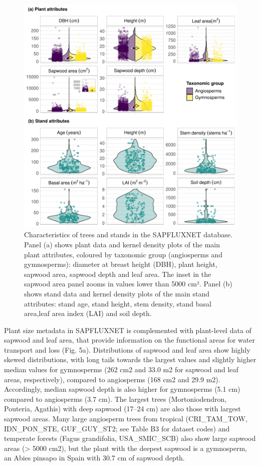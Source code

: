 \documentclass[11pt,twoside]{reedthesis}
\begin{document}
\setlength{\abovecaptionskip}{0pt}
\begin{figure}[hbt!]

{\centering \includegraphics[width=1\linewidth]{figure/CH3/Figure5} 

}

\caption[Characteristics of trees and stands in the SAPFLUXNET database.]{Characteristics of trees and stands in the SAPFLUXNET database. Panel (a) shows plant data and kernel density plots of the main plant attributes, coloured by taxonomic group (angiosperms and gymnosperms): diameter at breast height (DBH), plant height, sapwood area, sapwood depth and leaf area. The inset in the sapwood area panel zooms in values lower than 5000 cm². Panel (b) shows stand data and kernel density plots of the main stand attributes: stand age, stand height, stem density, stand basal area,leaf area index (LAI) and soil depth.}\label{fig:Ch2plot5}
\end{figure}
Plant size metadata in SAPFLUXNET is complemented with plant-level data
of sapwood and leaf area, that provide information on the functional
areas for water transport and loss (Fig. 5a). Distributions of sapwood
and leaf area show highly skewed distributions, with long tails towards
the largest values and slightly higher median values for gymnosperms
(262 cm2 and 33.0 m2 for sapwood and leaf areas, respectively), compared
to angiosperms (168 cm2 and 29.9 m2). Accordingly, median sapwood depth
is also higher for gymnosperms (5.1 cm) compared to angiosperms (3.7
cm). The largest trees (Mortoniodendron, Pouteria, Agathis) with deep
sapwood (17--24 cm) are also those with largest sapwood areas. Many
large angiosperm trees from tropical (CRI\_TAM\_TOW, IDN\_PON\_STE,
GUF\_GUY\_ST2; see Table B3 for dataset codes) and temperate forests
(Fagus grandifolia, USA\_SMIC\_SCB) also show large sapwood areas
(\textgreater{} 5000 cm2), but the plant with the deepest sapwood is a
gymnosperm, an Abies pinsapo in Spain with 30.7 cm of sapwood depth.\par
\end{document}
